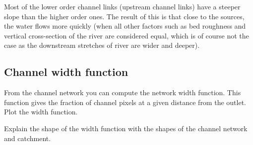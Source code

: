 \documentclass[twocolumn, 10pt, a4paper]{article}
\newenvironment{PC_prac_environment}{
\def\Q{\noindent \color{Gray}\rule[-0.1cm]{\columnwidth}{1.5pt}  \color{black} } \let\ques\Q 
\def\nQ{\noindent \color{black} } \let\ques\nQ 
\def\E{\color{Gray}\rule[0.3cm]{\columnwidth}{1.5pt} \color{black}} \let\ques\E }
\newcommand{\A}[2] { \ifthenelse{\boolean{showanswer}} {\noindent \color{cyan}{#2}\color{black}} {\multido{}{#1}{\noindent \color{light-gray}\hrulefill\\} } }
\begin{document}
\begin{PC_prac_environment}
{Most of the lower order channel links (upstream channel links) have a steeper slope than the higher order ones. The result of this is that close to the sources, the water flows more quickly (when all other factors such as bed roughness and vertical cross-section of the river are considered equal, which is of course not the case as the downstream stretches of river are wider and deeper).\\}
\E


\subsection{Channel width function}
\label{width}
From the channel network you can compute the network width function. This function gives the fraction of channel pixels at a given distance from the outlet. Plot the width function.

\Q Explain the shape of the width function with the shapes of the channel network and catchment.\\
\E


\end{PC_prac_environment}
\end{document}
